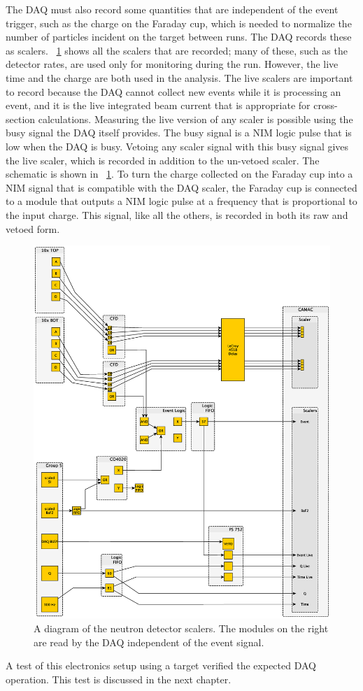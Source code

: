 The DAQ must also record some quantities that are independent of the event trigger, such as the charge on the Faraday cup, which is needed to normalize the number of particles incident on the target between runs.  The DAQ records these as scalers.  {\fig}~\ref{fig:scalerElectronics} shows all the scalers that are recorded; many of these, such as the detector rates, are used only for monitoring during the run.  However, the live time and the charge are both used in the analysis.  The live scalers are important to record because the DAQ cannot collect new events while it is processing an event, and it is the live integrated beam current that is appropriate for cross-section calculations.  Measuring the live version of any scaler is possible using the busy signal the DAQ itself provides.  The busy signal is a NIM logic pulse that is low when the DAQ is busy.  Vetoing any scaler signal with this busy signal gives the live scaler, which is recorded in addition to the un-vetoed scaler.  The schematic is shown in {\fig}~\ref{fig:scalerElectronics}.  To turn the charge collected on the Faraday cup into a NIM signal that is compatible with the DAQ scaler, the Faraday cup is connected to a module that outputs a NIM logic pulse at a frequency that is proportional to the input charge.  This signal, like all the others, is recorded in both its raw and vetoed form.
\begin{figure}[htp]
\centering
\includegraphics[height=0.8\textheight]{figures/electronics_scalers.eps}
\caption[Detector scalers.]{A diagram of the neutron detector scalers.  The modules on the right are read by the DAQ independent of the event signal.}
\label{fig:scalerElectronics}
\end{figure}
A test of this electronics setup using a  target verified the expected DAQ operation.  This test is discussed in the next chapter. 

%
% 
% 
